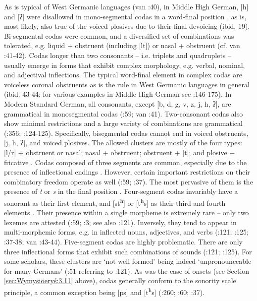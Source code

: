\documentclass[output=paper]{langscibook}
\begin{document}
As is typical of West Germanic languages (van \citealt{Oostendorp2020}:40), in Middle High German, [h] and [ʔ] were disallowed in mono-segmental codas in a word-final position \citep[161]{Paul2007}, as is, most likely, also true of the voiced plosives due to their final devoicing (ibid. 19). Bi-segmental codas were common, and a diversified set of combinations was tolerated, e.g. liquid + obstruent (including [lt]) or nasal + obstruent (cf. van \citealt{Oostendorp2020}:41-42). Codas longer than two consonants – i.e. triplets and quadruplets – usually emerge in forms that exhibit complex morphology, e.g. verbal, nominal, and adjectival inflections. The typical word-final element in complex codas are voiceless coronal obstruents as is the rule in West Germanic languages in general (ibid. 43-44; for various examples in Middle High German see \citealt{Paul2007}:146-175). In Modern Standard German, all consonants, except [b, d, g, v, z, j, h, ʔ], are grammatical in monosegmental codas (\citealt{Fox2005}:59; van \citealt{Oostendorp2020}:41). Two-consonant codas also show minimal restrictions and a large variety of combinations are grammatical (\citealt{Eisenberg1994}:356; \citealt{Russ1994}:124-125). Specifically, bisegmental codas cannot end in voiced obstruents, [j, h, ʔ], and voiced plosives. The allowed clusters are mostly of the four types: [l/r] + obstruent or nasal; nasal + obstruent; obstruent + [t]; and plosive + fricative \citep[59]{Fox2005}. Codas composed of three segments are common, especially due to the presence of inflectional endings \citep[125]{Russ1994}. However, certain important restrictions on their combinatory freedom operate as well (\citealt{Fox2005}:59; \citealt{Fagan2009}:37). The most pervasive of them is the presence of \textit{t} or \textit{s} in the final position \citep[59]{Fox2005}. Four-segment codas invariably have a sonorant as their first element, and [st\textsuperscript{h}] or [t\textsuperscript{h}s] as their third and fourth elements \citep[37-38]{Fagan2009}. Their presence within a single morpheme is extremely rare – only two lexemes are attested (\citealt{Fox2005}:59; \citealt{Fagan2009}:3; see also \citealt{Hall1992}:121). Inversely, they tend to appear in multi-morphemic forms, e.g. in inflected nouns, adjectives, and verbs (\citealt{Hall1992}:121; \citealt{Russ1994}:125; \citealt{Fagan2009}:37-38; van \citealt{Oostendorp2020}:43-44). Five-segment codas are highly problematic. There are only three inflectional forms that exhibit such combinations of sounds (\citealt{Hall1992}:121; \citealt{Russ1994}:125). For some scholars, these clusters are ‘not well formed’ \citep[48]{Wiese1996} being indeed ‘unpronounceable for many Germans’ (\citealt{Fagan2009}:51 referring to \citealt{Hall1992}:121). As was the case of onsets (see Section \ref{sec:Wymysiöeryś:3.11} above), codas generally conform to the sonority scale principle, a common exception being [ps] and [t\textsuperscript{h}s] (\citealt{Wiese1996}:260; \citealt{Fox2005}:60; \citealt{Fagan2009}:37).
\end{document}
